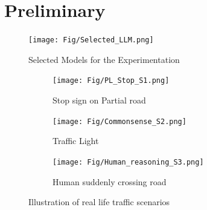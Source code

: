 \documentclass[conference]{IEEEtran}
\begin{document}
\section{Preliminary}
\begin{figure}[h]
    \centering
\texttt{[image: Fig/Selected\_LLM.png]}
    \caption{Selected Models for the Experimentation}
    \label{fig:enter-label}
\end{figure}

\begin{figure}[h] %
    \centering
    \begin{subfigure}[b]{0.3\textwidth}
        \texttt{[image: Fig/PL\_Stop\_S1.png]}
        \caption{Stop sign on Partial road}
    \end{subfigure}
    \hfill
    \begin{subfigure}[b]{0.3\textwidth}
        \texttt{[image: Fig/Commonsense\_S2.png]}
        \caption{Traffic Light}
    \end{subfigure}
    \hfill
    \begin{subfigure}[b]{0.3\textwidth}
        \texttt{[image: Fig/Human\_reasoning\_S3.png]}
        \caption{Human suddenly crossing road}
    \end{subfigure}
    \caption{Illustration of real life traffic scenarios}
    \label{fig:llm_outputs}
\end{figure}
\end{document}
